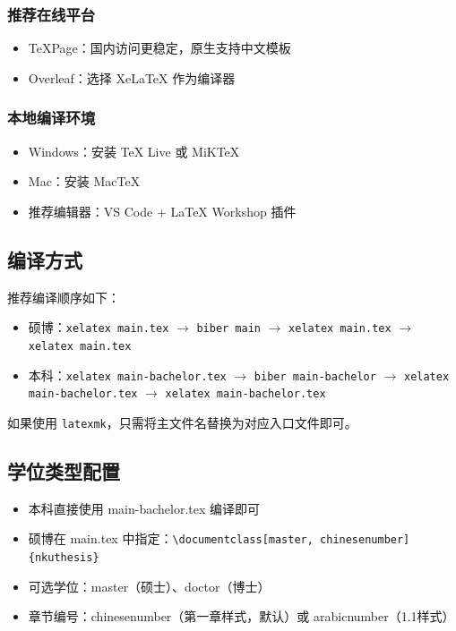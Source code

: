 \subsubsection{推荐在线平台}

\begin{itemize}
    \item TeXPage：国内访问更稳定，原生支持中文模板
    \item Overleaf：选择 XeLaTeX 作为编译器
\end{itemize}

\subsubsection{本地编译环境}

\begin{itemize}
    \item Windows：安装 TeX Live 或 MiKTeX
    \item Mac：安装 MacTeX
    \item 推荐编辑器：VS Code + LaTeX Workshop 插件
\end{itemize}

\subsection{编译方式}

推荐编译顺序如下：

\begin{itemize}
    \item 硕博：\texttt{xelatex main.tex} $\rightarrow$ \texttt{biber main} $\rightarrow$ \texttt{xelatex main.tex} $\rightarrow$ \texttt{xelatex main.tex}
    \item 本科：\texttt{xelatex main-bachelor.tex} $\rightarrow$ \texttt{biber main-bachelor} $\rightarrow$ \texttt{xelatex main-bachelor.tex} $\rightarrow$ \texttt{xelatex main-bachelor.tex}
\end{itemize}

如果使用 \texttt{latexmk}，只需将主文件名替换为对应入口文件即可。

\subsection{学位类型配置}

\begin{itemize}
    \item 本科直接使用 main-bachelor.tex 编译即可
    \item 硕博在 main.tex 中指定：\texttt{\textbackslash documentclass[master, chinesenumber]\{nkuthesis\}}
    \item 可选学位：master（硕士）、doctor（博士）
    \item 章节编号：chinesenumber（第一章样式，默认）或 arabicnumber（1.1样式）
\end{itemize}

